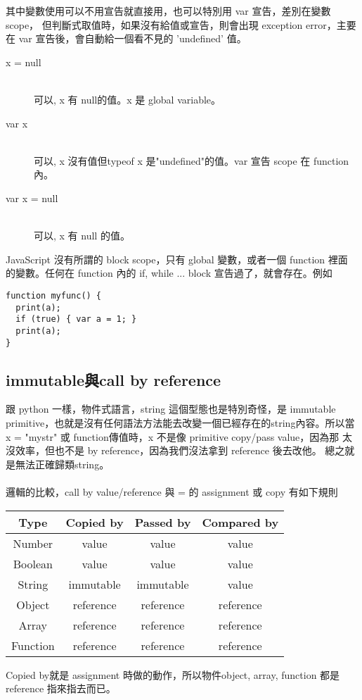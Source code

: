 其中變數使用可以不用宣告就直接用，也可以特別用 var 宣告，差別在變數 scope，
但判斷式取值時，如果沒有給值或宣告，則會出現 exception error，主要在 var
宣告後，會自動給一個看不見的 'undefined' 值。
\begin{description}
  \item[x = null] \hfill \\
    可以, x 有 null的值。x 是 global variable。
  \item[var x] \hfill \\
    可以, x 沒有值但typeof x 是"undefined"的值。var 宣告 scope 在 function 內。
  \item[var x = null] \hfill \\
    可以, x 有 null 的值。
\end{description}
JavaScript 沒有所謂的 block scope，只有 global 變數，或者一個 function 裡面
的變數。任何在 function 內的 if, while ... block 宣告過了，就會存在。例如
\begin{verbatim}
function myfunc() {
  print(a);
  if (true) { var a = 1; }
  print(a);
}
\end{verbatim}

  \subsection{immutable與call by reference}
  跟 python 一樣，物件式語言，string 這個型態也是特別奇怪，是 immutable
  primitive，也就是沒有任何語法方法能去改變一個已經存在的string內容。所以當 
  x = "mystr" 或 function傳值時，x 不是像 primitive copy/pass value，因為那
  太沒效率，但也不是 by reference，因為我們沒法拿到 reference 後去改他。
  總之就是無法正確歸類string。
  \\\\
  邏輯的比較，call by value/reference 與 = 的 assignment 或 copy 有如下規則
  \begin{center}
  \begin{tabular}{ c | c | c | c }
    \hline
    Type   & Copied by & Passed by & Compared by \\
    \hline
    Number & value     & value     & value \\
    Boolean& value     & value     & value \\
    String & immutable & immutable & value \\
    Object & reference & reference & reference \\
    Array  & reference & reference & reference \\
  Function & reference & reference & reference \\
    \hline
  \end{tabular}
  \end{center}
  Copied by就是 assignment 時做的動作，所以物件object, array, function 都是
  reference 指來指去而已。

